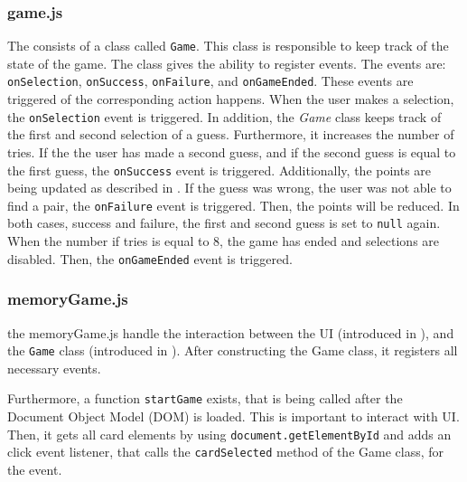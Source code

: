 \subsubsection{game.js}\label{subsubsec:03_impl_frontend_index}
The  consists of a class called \texttt{Game}. This class is responsible to keep track of the state of the game.
The class gives the ability to register events. The events are: \texttt{onSelection}, \texttt{onSuccess}, \texttt{onFailure}, and \texttt{onGameEnded}. These events are triggered of the corresponding action happens.
When the user makes a selection, the \texttt{onSelection} event is triggered. In addition, the \textit{Game} class keeps track of the first and second selection of a guess. Furthermore, it increases the number of tries.
If the the user has made a second guess, and if the second guess is equal to the first guess, the \texttt{onSuccess} event is triggered. Additionally, the points are being updated as described in .
If the guess was wrong, the user was not able to find a pair, the \texttt{onFailure} event is triggered. Then, the points will be reduced.
In both cases, success and failure, the first and second guess is set to \texttt{null} again.
%
When the number if tries is equal to 8, the game has ended and selections are disabled. Then, the \texttt{onGameEnded} event is triggered.

\subsubsection{memoryGame.js}\label{subsubsec:03_impl_frontend_memGame}
the memoryGame.js handle the interaction between the UI (introduced in ), and the \texttt{Game} class (introduced in ).
After constructing the Game class, it registers all necessary events.


Furthermore, a function \texttt{startGame} exists, that is being called after the Document Object Model (DOM) is loaded. This is important to interact with UI. Then, it gets all card elements by using \texttt{document.getElementById} and adds an click event listener, that calls the \texttt{cardSelected} method of the Game class, for the event.

